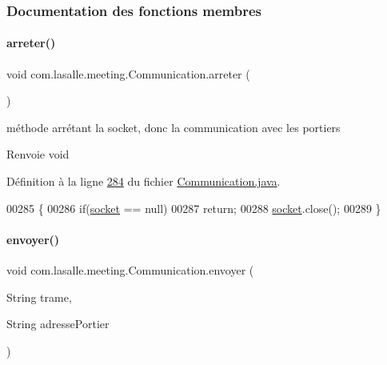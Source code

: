 \subsubsection{Documentation des fonctions membres}
\mbox{\label{classcom_1_1lasalle_1_1meeting_1_1_communication_abf23e6b879122267b3fe10233b4010a8}} 
\paragraph{\texorpdfstring{arreter()}{arreter()}}
{\footnotesize\ttfamily void com.\+lasalle.\+meeting.\+Communication.\+arreter (\begin{DoxyParamCaption}{ }\end{DoxyParamCaption})}



méthode arrétant la socket, donc la communication avec les portiers 

\begin{DoxyReturn}{Renvoie}
void 
\end{DoxyReturn}


Définition à la ligne \hyperlink{_communication_8java_source_l00284}{284} du fichier \hyperlink{_communication_8java_source}{Communication.\+java}.


\begin{DoxyCode}
00285     \{
00286         \textcolor{keywordflow}{if}(\hyperlink{classcom_1_1lasalle_1_1meeting_1_1_communication_a2a538f36640aecebbb833bbaf1f03858}{socket} == null)
00287             \textcolor{keywordflow}{return};
00288         \hyperlink{classcom_1_1lasalle_1_1meeting_1_1_communication_a2a538f36640aecebbb833bbaf1f03858}{socket}.close();
00289     \}
\end{DoxyCode}
\mbox{\label{classcom_1_1lasalle_1_1meeting_1_1_communication_a03f0e419513d7f33900dde412e2a4471}} 
\paragraph{\texorpdfstring{envoyer()}{envoyer()}}
{\footnotesize\ttfamily void com.\+lasalle.\+meeting.\+Communication.\+envoyer (\begin{DoxyParamCaption}\item[{String}]{trame,  }\item[{String}]{adresse\+Portier }\end{DoxyParamCaption})}



